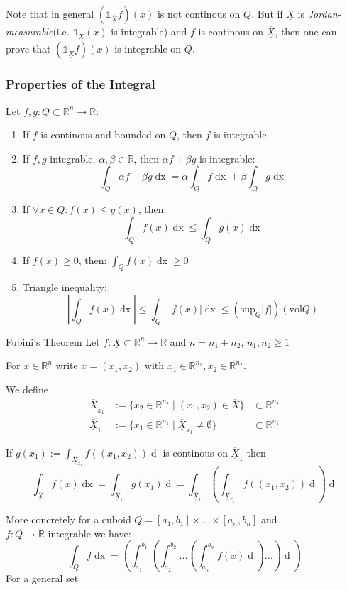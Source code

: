 \documentclass[a4paper,fontsize = 10pt]{article}
\def\R{\mathbb{R}}
\def\X{\underline{\overline{X}}}
\begin{document}
Note that in general $(\mathds{1}_{\X}f)(x)$ is not continous on $Q$. But if $\X$ is \textit{Jordan-measurable}(i.e. $\mathds{1}_{\X}(x)$ is integrable) and $f$ is continous on $\X$, then one can prove that $(\mathds{1}_{\X}f)(x)$ is integrable on $Q$.

\subsubsection{Properties of the Integral}
Let $f, g: Q \subset \R^n \to \R$:
\begin{enumerate}
  \item If $f$ is continous and bounded on $Q$, then $f$ is integrable.
  \item If $f,g$ integrable, $\alpha, \beta \in \R$, then $\alpha f + \beta g$ is integrable:
  \[\int_Q \alpha f + \beta g \mathop{dx} = \alpha \int_Q f \mathop{dx} + \beta \int_Q g \mathop{dx}\]
  \item If \(\forall x \in Q: f(x) \le g(x)\), then:
  \[\int_Q f(x) \mathop{dx} \le \int_Q g(x) \mathop{dx}\]
  \item If \(f(x) \ge 0\), then:
  \(\int_Q f(x) \mathop{dx} \geq 0\)
  \item Triangle inequality:
    \[\left| \int_Q f(x) \mathop{dx}\right| \le \int_Q \left|f(x)\right| \mathop{dx} \leq (\text{sup}_{Q}|f|)(\text{vol}Q)\]
\end{enumerate}


\begin{mainbox}{Fubini's Theorem}
    Let $f: \X \subset \R^n \to \R$ and $n = n_1 + n_2$, $n_1, n_2 \geq 1$
    
    For $x \in \R^n$ write $x = (x_1,x_2)$ with $x_1 \in \R^{n_1}, x_2 \in \R^{n_2}$.

    We define 
    \begin{align*}
        \X_{x_1} &:= \{x_2 \in \R^{n_2} \mid (x_1,x_2) \in \X\} &\subset \R^{n_2}\\
        \X_1 &:= \{x_1 \in \R^{n_1} \mid \X_{x_1} \neq \emptyset\} &\subset \R^{n_1}
    \end{align*}

    If $g(x_1) := \int_{\X_{x_1}}f((x_1,x_2))\mathop{dx_2}$ is continous on $\X_1$ then 
    \[\int_{\X}f(x)\mathop{dx} = \int_{\X_1}g(x_1)\mathop{dx_1} = \int_{\X_1}\left(\int_{\X_{x_1}}f((x_1,x_2))\mathop{dx_2}\right)\mathop{dx_1}\]
\end{mainbox}
More concretely for a cuboid $Q = [a_1,b_1]\times ... \times [a_n, b_n]$ and \\$f: Q \to \R$ integrable we have:
\[\int_{Q}f\mathop{dx} = \left(\int_{a_1}^{b_1}\left(\int_{a_2}^{b_2} ...\left(\int_{a_n}^{b_n}f(x)\mathop{dx_n}\right) ... \right)\mathop{dx_1}\right)\]
For a general set 
\end{document}
